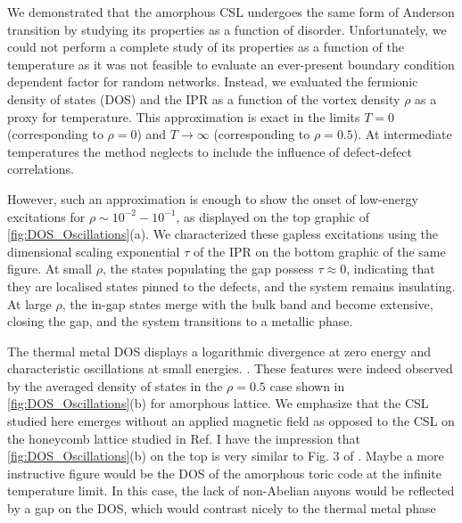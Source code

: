 We demonstrated that the amorphous CSL undergoes the same form of
Anderson transition by studying its properties as a function of
disorder. Unfortunately, we could not perform a complete study of its
properties as a function of the temperature as it was not feasible to
evaluate an ever-present boundary condition dependent factor
\autocite{pedrocchiPhysicalSolutionsKitaev2011,Zschocke_Physical_states2015}
for random networks. Instead, we evaluated the fermionic density of
states (DOS) and the IPR as a function of the vortex density \(\rho\) as
a proxy for temperature. This approximation is exact in the limits
\(T = 0\) (corresponding to \(\rho = 0\)) and \(T \to \infty\)
(corresponding to \(\rho = 0.5\)). At intermediate temperatures the
method neglects to include the influence of defect-defect correlations.

However, such an approximation is enough to show the onset of low-energy
excitations for \(\rho \sim 10^{-2}-10^{-1}\), as displayed on the top
graphic of
\protect\hyperlink{fig:DOS_Oscillations}{{[}fig:DOS\_Oscillations{]}}(a).
We characterized these gapless excitations using the dimensional scaling
exponential \(\tau\) of the IPR on the bottom graphic of the same
figure. At small \(\rho\), the states populating the gap possess
\(\tau\approx0\), indicating that they are localised states pinned to
the defects, and the system remains insulating. At large \(\rho\), the
in-gap states merge with the bulk band and become extensive, closing the
gap, and the system transitions to a metallic phase.

The thermal metal DOS displays a logarithmic divergence at zero energy
and characteristic oscillations at small energies.
\autocite{bocquet_disordered_2000,selfThermallyInducedMetallic2019}.
These features were indeed observed by the averaged density of states in
the \(\rho = 0.5\) case shown in
\protect\hyperlink{fig:DOS_Oscillations}{{[}fig:DOS\_Oscillations{]}}(b)
for amorphous lattice. We emphasize that the CSL studied here emerges
without an applied magnetic field as opposed to the CSL on the honeycomb
lattice studied in Ref. \autocite{selfThermallyInducedMetallic2019} I
have the impression that
\protect\hyperlink{fig:DOS_Oscillations}{{[}fig:DOS\_Oscillations{]}}(b)
on the top is very similar to Fig. 3 of
\autocite{selfThermallyInducedMetallic2019}. Maybe a more instructive
figure would be the DOS of the amorphous toric code at the infinite
temperature limit. In this case, the lack of non-Abelian anyons would be
reflected by a gap on the DOS, which would contrast nicely to the
thermal metal phase

